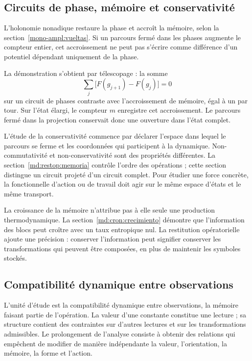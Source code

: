 \subsection{Circuits de phase, mémoire et conservativité}
\label{md:restop:conservatividad}

L’holonomie nonadique restaure la phase et accroît la mémoire, selon
la section~\ref{mono-ampl:vueltas}. Si un parcours fermé dans les phases
augmente le compteur entier, cet accroissement ne peut pas s’écrire comme
différence d’un potentiel dépendant uniquement de la phase.

La démonstration s’obtient par télescopage : la somme
\begin{equation}
 \sum_j\bigl[F(g_{j+1})-F(g_j)\bigr]=0
 \label{md:restop:potencial-fase}
\end{equation}
sur un circuit de phases contraste avec l’accroissement de mémoire, égal
à un par tour. Sur l’état élargi, le compteur $m$ enregistre
cet accroissement. Le parcours fermé dans la projection conservait
donc une ouverture dans l’état complet.

L’étude de la conservativité commence par déclarer l’espace dans
lequel le parcours se ferme et les coordonnées qui participent à la
dynamique. Non-commutativité et non-conservativité sont des propriétés
différentes. La section~\ref{md:restop:memoria} contrôle l’ordre des
opérations ; cette section distingue un circuit projeté d’un circuit
complet. Pour étudier une force concrète, la fonctionnelle d’action ou de
travail doit agir sur le même espace d’états et le même transport.

La croissance de la mémoire n’attribue pas à elle seule une production
thermodynamique. La section~\ref{md:cron:crecimiento} démontre que
l’information des blocs peut croître avec un taux entropique nul.
La restitution opératorielle ajoute une précision : conserver l’information
peut signifier conserver les transformations qui peuvent être composées,
en plus de maintenir les symboles stockés.

\subsection{Compatibilité dynamique entre observations}
\label{md:restop:sintesis}

L’unité d’étude est la compatibilité dynamique entre observations,
la mémoire faisant partie de l’opération. La valeur d’une constante
constitue une lecture ; sa structure contient des contraintes sur d’autres
lectures et sur les transformations admissibles. Le prolongement de
l’analyse consiste à obtenir des relations qui empêchent de modifier de manière
indépendante la valeur, l’orientation, la mémoire, la forme et l’action.

